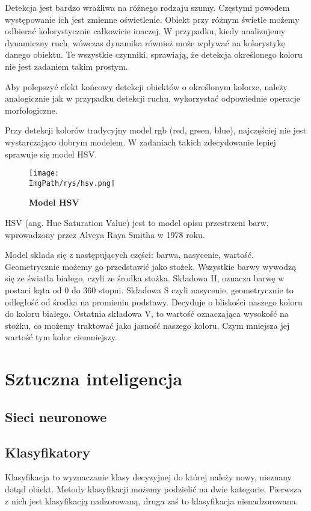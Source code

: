 \documentclass[a4paper,12pt,twoside,openany]{report}
\newcommand{\ImgPath}{.}
\begin{document}
Detekcja jest bardzo wrażliwa na różnego rodzaju szumy. Częstymi powodem występowanie ich jest zmienne oświetlenie. Obiekt przy różnym świetle możemy odbierać kolorystycznie całkowicie inaczej. W przypadku, kiedy analizujemy dynamiczny ruch, wówczas dynamika również może wpływać na kolorystykę danego obiektu. Te wszystkie czynniki, sprawiają, że detekcja określonego koloru nie jest zadaniem takim prostym. 

Aby polepszyć efekt końcowy detekcji obiektów o określonym kolorze, należy analogicznie jak w przypadku detekcji ruchu, wykorzystać odpowiednie operacje morfologiczne. 

Przy detekcji kolorów tradycyjny model rgb (red, green, blue), najczęściej nie jest wystarczająco dobrym modelem. W zadaniach takich zdecydowanie lepiej sprawuje się model HSV.

\begin{figure}[H]	
	\centering
	\texttt{[image: \\ImgPath/rys/hsv.png]}
	
	\caption{  \textbf{Model HSV}}
\end{figure}

HSV (ang. Hue Saturation Value) jest to model opisu przestrzeni barw, wprowadzony przez Alveya Raya Smitha w 1978 roku.

Model składa się z następujących części: barwa, nasycenie, wartość. Geometrycznie możemy go przedstawić jako stożek. Wszystkie barwy wywodzą się ze światła białego, czyli ze środka stożka. Składowa H, oznacza barwę w postaci kąta od 0 do 360 stopni. Składowa S czyli nasycenie, geometrycznie to odległość od środka na promieniu podstawy. Decyduje o bliskości naszego koloru do koloru białego. Ostatnia składowa V, to wartość oznaczająca wysokość na stożku, co możemy traktować jako jasność naszego koloru. Czym mniejsza jej wartość tym kolor ciemniejszy.

\chapter{Sztuczna inteligencja}
\section{Sieci neuronowe}


\section{Klasyfikatory}
Klasyfikacja to wyznaczanie klasy decyzyjnej do której należy nowy, nieznany dotąd obiekt. Metody klasyfikacji możemy podzielić na dwie kategorie. Pierwsza z nich jest  klasyfikacją nadzorowaną, druga zaś to klasyfikacja nienadzorowana. 
\end{document}
